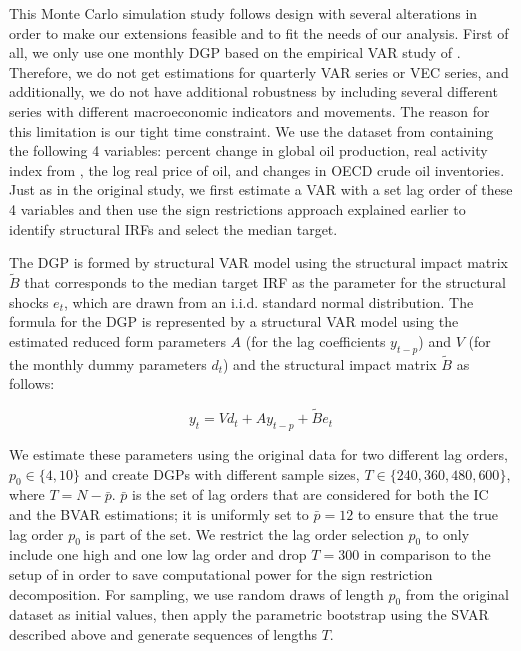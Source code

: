 \documentclass[12pt, a4paper]{article}
\begin{document}
This Monte Carlo simulation study follows \citet{ivanovPractitionersGuideLag2005} design with several alterations in order to make our extensions feasible and to fit the needs of our analysis. First of all, we only use one monthly DGP based on the empirical VAR study of \citet{kilianRoleInventoriesSpeculative2014}. Therefore, we do not get estimations for quarterly VAR series or VEC series, and additionally, we do not have additional robustness by including several different series with different macroeconomic indicators and movements. The reason for this limitation is our tight time constraint. We use the dataset from \citet{kilianRoleInventoriesSpeculative2014} containing the following 4 variables: percent change in global oil production, real activity index from \citet{kilianNotAllOil2009}, the log real price of oil, and changes in OECD crude oil inventories. Just as in the original study, we first estimate a VAR with a set lag order of these 4 variables and then use the sign restrictions approach explained earlier to identify structural IRFs and select the median target.

The DGP is formed by structural VAR model using the structural impact matrix $\tilde{B}$ that corresponds to the median target IRF as the parameter for the structural shocks $e_t$, which are drawn from an i.i.d. standard normal distribution. The formula for the DGP is represented by a structural VAR model using the estimated reduced form parameters $A$ (for the lag coefficients $y_{t-p}$) and $V$ (for the monthly dummy parameters $d_t$) and the structural impact matrix $\tilde{B}$ as follows:

\begin{equation}
    y_t = V d_t + A y_{t-p} + \tilde{B} e_t
\end{equation}

We estimate these parameters using the original data for two different lag orders, $p_0 \in \{4,10\}$ and create DGPs with different sample sizes, $T \in \{240, 360, 480, 600\}$, where $T=N-\bar{p}$. $\bar{p}$ is the set of lag orders that are considered for both the IC and the BVAR estimations; it is uniformly set to $\bar{p}=12$ to ensure that the true lag order $p_0$ is part of the set. We restrict the lag order selection $p_0$ to only include one high and one low lag order and drop $T=300$ in comparison to the setup of \citet{ivanovPractitionersGuideLag2005} in order to save computational power for the sign restriction decomposition. For sampling, we use random draws of length $p_0$ from the original dataset as initial values, then apply the parametric bootstrap using the SVAR described above and generate sequences of lengths $T$.
\end{document}
